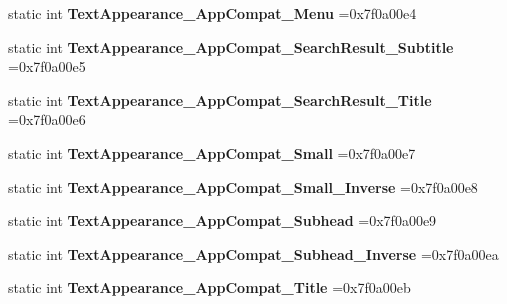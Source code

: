 \begin{DoxyCompactItemize}
static int {\bfseries Text\+Appearance\+\_\+\+App\+Compat\+\_\+\+Menu} =0x7f0a00e4
\item 
\mbox{\label{classandroid_1_1support_1_1v7_1_1recyclerview_1_1R_1_1style_a8144c32a27eee7c2894e8c5d72bd811e}} 
static int {\bfseries Text\+Appearance\+\_\+\+App\+Compat\+\_\+\+Search\+Result\+\_\+\+Subtitle} =0x7f0a00e5
\item 
\mbox{\label{classandroid_1_1support_1_1v7_1_1recyclerview_1_1R_1_1style_a787dad8dbf3a7618e7e49e2c63632a85}} 
static int {\bfseries Text\+Appearance\+\_\+\+App\+Compat\+\_\+\+Search\+Result\+\_\+\+Title} =0x7f0a00e6
\item 
\mbox{\label{classandroid_1_1support_1_1v7_1_1recyclerview_1_1R_1_1style_a24635952062e013e04c9d10520e59ec1}} 
static int {\bfseries Text\+Appearance\+\_\+\+App\+Compat\+\_\+\+Small} =0x7f0a00e7
\item 
\mbox{\label{classandroid_1_1support_1_1v7_1_1recyclerview_1_1R_1_1style_a53812da80c9a785c46ac9957e29e6802}} 
static int {\bfseries Text\+Appearance\+\_\+\+App\+Compat\+\_\+\+Small\+\_\+\+Inverse} =0x7f0a00e8
\item 
\mbox{\label{classandroid_1_1support_1_1v7_1_1recyclerview_1_1R_1_1style_a8065bccf0bc43b5d7332d3d48be3e5d4}} 
static int {\bfseries Text\+Appearance\+\_\+\+App\+Compat\+\_\+\+Subhead} =0x7f0a00e9
\item 
\mbox{\label{classandroid_1_1support_1_1v7_1_1recyclerview_1_1R_1_1style_a7d7796a65151ebe9e8d8497e465a65b3}} 
static int {\bfseries Text\+Appearance\+\_\+\+App\+Compat\+\_\+\+Subhead\+\_\+\+Inverse} =0x7f0a00ea
\item 
\mbox{\label{classandroid_1_1support_1_1v7_1_1recyclerview_1_1R_1_1style_a60aa473a7fd27e15d2e88fc7ca5469a8}} 
static int {\bfseries Text\+Appearance\+\_\+\+App\+Compat\+\_\+\+Title} =0x7f0a00eb

\end{DoxyCompactItemize}
